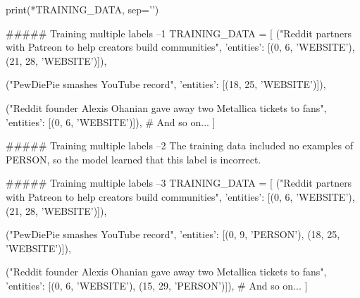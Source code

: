 print(*TRAINING_DATA, sep='\n')



##### Training multiple labels  --1
TRAINING_DATA = [
    ("Reddit partners with Patreon to help creators build communities", 
     {'entities': [(0, 6, 'WEBSITE'), (21, 28, 'WEBSITE')]}),
  
    ("PewDiePie smashes YouTube record", 
     {'entities': [(18, 25, 'WEBSITE')]}),
  
    ("Reddit founder Alexis Ohanian gave away two Metallica tickets to fans", 
     {'entities': [(0, 6, 'WEBSITE')]}),
    # And so on...
]


##### Training multiple labels  --2
The training data included no examples of PERSON, so the model learned that this label is incorrect.


##### Training multiple labels  --3
TRAINING_DATA = [
    ("Reddit partners with Patreon to help creators build communities", 
     {'entities': [(0, 6, 'WEBSITE'), (21, 28, 'WEBSITE')]}),
  
    ("PewDiePie smashes YouTube record", 
     {'entities': [(0, 9, 'PERSON'), (18, 25, 'WEBSITE')]}),
  
    ("Reddit founder Alexis Ohanian gave away two Metallica tickets to fans", 
     {'entities': [(0, 6, 'WEBSITE'), (15, 29, 'PERSON')]}),
    # And so on...
]


